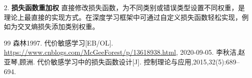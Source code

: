 \documentclass[12pt,a4paper]{article}
\begin{document}
2. \textbf{损失函数重加权}
直接修改损失函数，为不同类别或错误类型设置不同权重，是理论上最直接的实现方式。在深度学习框架中可通过自定义损失函数轻松实现，例如为交叉熵损失添加类别权重。

\begin{thebibliography}{99}
     森林1997. 代价敏感学习[EB/OL]. \url{https://www.cnblogs.com/McGeeForest/p/13618938.html}, 2020-09-05.
     李秋洁,赵亚琴,顾洲. 代价敏感学习中的损失函数设计[J]. 控制理论与应用,2015,32(5):689--694.
\end{thebibliography}
\end{document}
